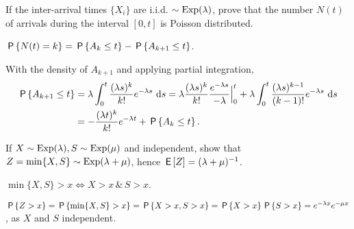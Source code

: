 \begin{exercise}\label{ex:l-213}
 If 
 the inter-arrival times $\{X_i\}$ are i.i.d.
 $\sim \Exp(\lambda)$, prove that the number $N(t)$ of arrivals during the interval $[0,t]$ is Poisson distributed.
\begin{hint}
 $\P{N(t)=k} = \P{A_k \leq t} - \P{A_{k+1} \leq t}$.
\end{hint}
\begin{solution}
With  the density of $A_{k+1}$ and applying partial integration,
\begin{align*}
\P{A_{k+1} \leq t} 
&= \lambda \int_0^t \frac{(\lambda s)^{k}}{k!}e^{-\lambda s}\, \d s 
= \lambda \frac{(\lambda s)^{k}}{k!}\frac{e^{-\lambda s}}{-\lambda} \Big|_{0}^t + \lambda \int_0^t \frac{(\lambda s)^{k-1}}{(k-1)!}e^{-\lambda s}\, \d s \\
&= - \frac{(\lambda t)^{k}}{k!} e^{-\lambda t} + \P{A_k \leq t}.
\end{align*}
\end{solution}
\end{exercise}



\begin{exercise}\label{ex:10}
 If  $X\sim\Exp(\lambda), S\sim\Exp(\mu)$ and
 independent, show that $Z=\min\{X,S\}\sim\Exp(\lambda+\mu)$,
hence $\E Z = (\lambda+\mu)^{-1}$.
\begin{hint}
$\min\{X, S\}>x \iff X>x \, \& \, S> x$.
\end{hint}
\begin{solution}
$\P{Z>x} = \P{\min\{X,S\}>x} = \P{X>x, S> x} = \P{X>x}\P{S>x}  = e^{-\lambda x} e^{-\mu x}$, as  $X$ and $S$ independent.
\end{solution}
\end{exercise}

